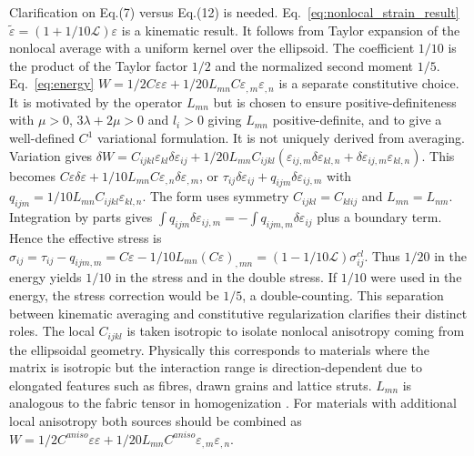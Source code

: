 \documentclass[final,3p,times,fleqn]{elsarticle}
\newcommand{\rev}[1]{\textcolor{revcolor}{#1}}
\begin{document}
\rev{Clarification on Eq.(7) versus Eq.(12) is needed. Eq.~\eqref{eq:nonlocal_strain_result} $\tilde{\varepsilon}=(1+1/10\mathcal{L})\varepsilon$ is a kinematic result. It follows from Taylor expansion of the nonlocal average with a uniform kernel over the ellipsoid. The coefficient $1/10$ is the product of the Taylor factor $1/2$ and the normalized second moment $1/5$. Eq.~\eqref{eq:energy} $W=1/2C\varepsilon\varepsilon+1/20 L_{mn}C\varepsilon_{,m}\varepsilon_{,n}$ is a separate constitutive choice. It is motivated by the operator $L_{mn}$ but is chosen to ensure positive-definiteness with $\mu>0$, $3\lambda+2\mu>0$ and $l_i>0$ giving $L_{mn}$ positive-definite, and to give a well-defined $C^1$ variational formulation. It is not uniquely derived from averaging. Variation gives $\delta W = C_{ijkl}\varepsilon_{kl}\delta\varepsilon_{ij}+1/20 L_{mn}C_{ijkl}(\varepsilon_{ij,m}\delta\varepsilon_{kl,n}+\delta\varepsilon_{ij,m}\varepsilon_{kl,n})$. This becomes $C\varepsilon\delta\varepsilon+1/10 L_{mn}C\varepsilon_{,n}\delta\varepsilon_{,m}$, or $\tau_{ij}\delta\varepsilon_{ij}+q_{ijm}\delta\varepsilon_{ij,m}$ with $q_{ijm}=1/10 L_{mn}C_{ijkl}\varepsilon_{kl,n}$. The form uses symmetry $C_{ijkl}=C_{klij}$ and $L_{mn}=L_{nm}$. Integration by parts gives $\int q_{ijm}\delta\varepsilon_{ij,m}=-\int q_{ijm,m}\delta\varepsilon_{ij}$ plus a boundary term. Hence the effective stress is $\sigma_{ij}=\tau_{ij}-q_{ijm,m}=C\varepsilon-1/10 L_{mn}(C\varepsilon)_{,mn}=(1-1/10\mathcal{L})\sigma^{cl}_{ij}$. Thus $1/20$ in the energy yields $1/10$ in the stress and in the double stress. If $1/10$ were used in the energy, the stress correction would be $1/5$, a double-counting. This separation between kinematic averaging and constitutive regularization clarifies their distinct roles. The local $C_{ijkl}$ is taken isotropic to isolate nonlocal anisotropy coming from the ellipsoidal geometry. Physically this corresponds to materials where the matrix is isotropic but the interaction range is direction-dependent due to elongated features such as fibres, drawn grains and lattice struts. $L_{mn}$ is analogous to the fabric tensor in homogenization \cite{LazarPo2015,Polizzotto2018,Auffray2019}. For materials with additional local anisotropy both sources should be combined as $W=1/2 C^{aniso}\varepsilon\varepsilon+1/20 L_{mn}C^{aniso}\varepsilon_{,m}\varepsilon_{,n}$.}
\end{document}
